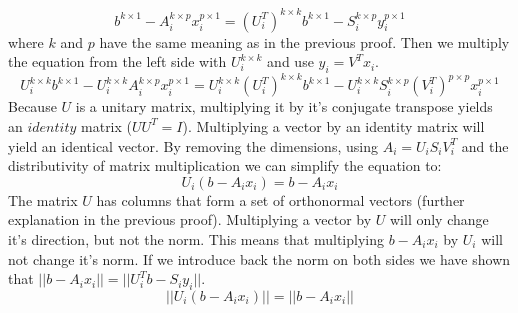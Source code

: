 \documentclass[12pt]{article}
\begin{document}
\[
b^{k \times 1} - A_i^{k \times p} x_i^{p \times 1} = (U_i^{T})^{k \times k}b^{k \times 1} - S_i^{k \times p}y_i^{p \times 1}
\]
\newline
where $k$ and $p$ have the same meaning as in the previous proof. Then we multiply the equation from the left side with $U_i^{k \times k}$ and use $y_i = V^Tx_i$. \\

\[
U_i^{k \times k}b^{k \times 1} - U_i^{k \times k}A_i^{k \times p} x_i^{p \times 1} = U_i^{k \times k}(U_i^{T})^{k \times k}b^{k \times 1} - U_i^{k \times k}S_i^{k \times p}(V_i^{T})^{p \times p}x_i^{p \times 1}
\]
\newline
Because $U$ is a unitary matrix, multiplying it by it's conjugate transpose yields an $identity$ matrix ($UU^T = I$). Multiplying a vector by an identity matrix will yield an identical vector. By removing the dimensions, using $A_i = U_iS_iV_i^{T}$ and the distributivity of matrix multiplication we can simplify the equation to: \\

\[
U_i(b - A_ix_i) = b - A_ix_i
\]
\newline
The matrix $U$ has columns that form a set of orthonormal vectors (further explanation in the previous proof). Multiplying a vector by $U$ will only change it's direction, but not the norm. This means that multiplying $b - A_ix_i$ by $U_i$ will not change it's norm. If we introduce back the norm on both sides we have shown that $||b - A_ix_i|| = ||U_i^{T}b - S_iy_i||$. \\
\[
||U_i(b - A_ix_i)|| = ||b - A_ix_i||
\]
\end{document}
